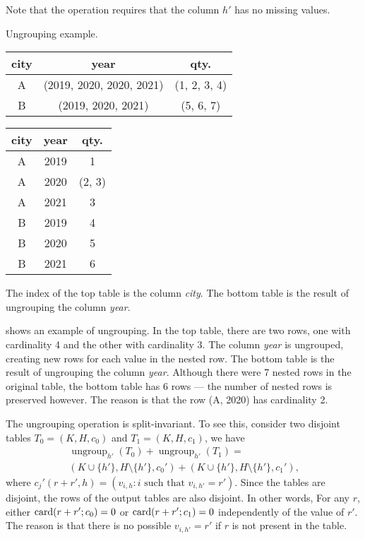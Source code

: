 Note that the operation requires that the column $h'$ has no missing values.

\begin{tablebox}[label=tab:ungroup]{Ungrouping example.}
  \centering
  \begin{tabular}{ccc}
    \toprule
    \textbf{city} & \textbf{year} & \textbf{qty.} \\
    \midrule
    A & (2019, 2020, 2020, 2021) & (1, 2, 3, 4) \\
    B & (2019, 2020, 2021) & (5, 6, 7) \\
    \bottomrule
  \end{tabular}

  \vspace{1em}
  \begin{tabular}{ccc}
    \toprule
    \textbf{city} & \textbf{year} & \textbf{qty.} \\
    \midrule
    A & 2019 & 1 \\
    A & 2020 & (2, 3) \\
    A & 2021 & 3 \\
    B & 2019 & 4 \\
    B & 2020 & 5 \\
    B & 2021 & 6 \\
    \bottomrule
  \end{tabular}
  \tcblower
  The index of the top table is the column \emph{city}.  The bottom table is the result of
  ungrouping the column \emph{year}.
\end{tablebox}

 shows an example of ungrouping.  In the top table, there are two rows,
one with cardinality 4 and the other with cardinality 3.  The column \emph{year} is
ungrouped, creating new rows for each value in the nested row.  The bottom table is the
result of ungrouping the column \emph{year}.  Although there were 7 nested rows in the
original table, the bottom table has 6 rows --- the number of nested rows is preserved
however.  The reason is that the row (A, 2020) has cardinality 2.

The ungrouping operation is split-invariant.  To see this, consider two disjoint tables
$T_0 = (K, H, c_0)$ and $T_1 = (K, H, c_1)$, we have
\begin{multline*}
  \operatorname{ungroup}_{h'}(T_0) + \operatorname{ungroup}_{h'}(T_1) = \\
    \left(K \cup \{h'\}, H \setminus \{h'\}, c_0'\right) +
    \left(K \cup \{h'\}, H \setminus \{h'\}, c_1'\right)\text{,}
\end{multline*}
where $c_j'(r + r', h) = (v_{i,h} : i \text{ such that } v_{i, h'} = r')$. Since the
tables are disjoint, the rows of the output tables are also disjoint.  In other words,
For any $r$, either $\rowcard[{r + r'; c_0}] = 0$ or $\rowcard[{r + r'; c_1}] = 0$
independently of the value of $r'$.  The reason is that there is no possible $v_{i,h'} =
r'$ if $r$ is not present in the table.

